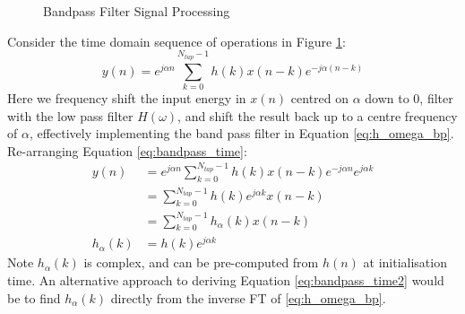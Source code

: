 \documentclass{article}
\begin{document}
\begin{figure}[h]
\caption{Bandpass Filter Signal Processing}
\label{fig:bandpass_proc}
\vspace{5mm}
\begin{center}
\end{center}
\end{figure}

Consider the time domain sequence of operations in Figure \ref{fig:bandpass_proc}:
\begin{equation} \label{eq:bandpass_time}
y(n) = e^{j \alpha n} \sum_{k=0}^{N_{tap}-1} h(k) x(n-k) e^{-j \alpha (n-k)}
\end{equation}
Here we frequency shift the input energy in $x(n)$ centred on $\alpha$ down to 0, filter with the low pass filter $H(\omega)$, and shift the result back up to a centre frequency of $\alpha$, effectively implementing the band pass filter in Equation \ref{eq:h_omega_bp}.  Re-arranging Equation \ref{eq:bandpass_time}:
\begin{equation} \label{eq:bandpass_time2}
\begin{split}
y(n) &= e^{j \alpha n} \sum_{k=0}^{N_{tap}-1}  h(k) x(n-k) e^{-j \alpha n} e^{j \alpha k} \\
     &= \sum_{k=0}^{N_{tap}-1} h(k) e^{j \alpha k} x(n-k) \\
     &= \sum_{k=0}^{N_{tap}-1} h_{\alpha}(k) x(n-k) \\
h_{\alpha}(k) &= h(k) e^{j \alpha k}     
\end{split}
\end{equation}
Note $h_{\alpha}(k)$ is complex, and can be pre-computed from $h(n)$ at initialisation time. An alternative approach to deriving Equation \ref{eq:bandpass_time2} would be to find $h_{\alpha}(k)$ directly from the inverse FT of \eqref{eq:h_omega_bp}.
\end{document}
